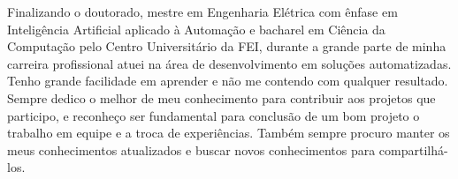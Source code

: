 

\begin{cvparagraph}

Finalizando o doutorado, mestre em Engenharia Elétrica com ênfase em Inteligência Artificial aplicado à Automação e bacharel em Ciência da Computação pelo Centro Universitário da FEI, durante a grande parte de minha carreira profissional atuei na área de desenvolvimento em soluções automatizadas. Tenho grande facilidade em aprender e não me contendo com qualquer resultado. Sempre dedico o melhor de meu conhecimento para contribuir aos projetos que participo, e reconheço ser fundamental para conclusão de um bom projeto o trabalho em equipe e a troca de experiências. Também sempre procuro manter os meus conhecimentos atualizados e buscar novos conhecimentos para compartilhá-los.
\end{cvparagraph}

